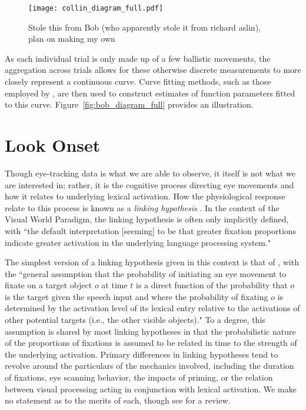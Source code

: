 \begin{figure}[H]
\centering
\texttt{[image: collin\_diagram\_full.pdf]}
\caption{Stole this from Bob (who apparently stole it from richard aslin), plan on making my own}
\label{fig:collin_diagram_full}
\end{figure}



As each individual trial is only made up of a few ballistic movements, the aggregation across trials allows for these otherwise discrete measurements to more closely represent a continuous curve. Curve fitting methods, such as those employed by , are then used to construct estimates of function parameters fitted to this curve. Figure~\ref{fig:bob_diagram_full} provides an illustration.


\section{Look Onset}

Though eye-tracking data is what we are able to observe, it itself is not what we are interested in; rather, it is the cognitive process directing eye movements and how it relates to underlying lexical activation. How the physiological response relate to this process is known as a \textit{linking hypothesis} \cite{Magnuson2019}. In the context of the Visual World Paradigm, the linking hypothesis is often only implicitly defined, with ``the default interpretation [seeming] to be that greater fixation proportions indicate greater activation in the underlying language processing system." 

The simplest version of a linking hypothesis given in this context is that of \cite{allopenna1998tracking}, with  the ``general assumption that the probability of initiating an eye movement to fixate on a target object $o$ at time $t$ is a direct function of the probability that $o$ is the target given the speech input and where the probability of fixating $o$ is determined by the activation level of its lexical entry relative to the activations of other potential targets (i.e., the other visible objects)." To a degree, this assumption is shared by most linking hypotheses in that the probabilistic nature of the proportions of fixations is assumed to be related in time to the strength of the underlying activation. Primary differences in linking hypotheses tend to revolve around the particulars of the mechanics involved, including the duration of fixations, eye scanning behavior, the impacts of priming, or the relation between visual  processing acting in conjunction with lexical activation. We make no statement as to the merits of each, though see \cite{Magnuson2019} for a review.

